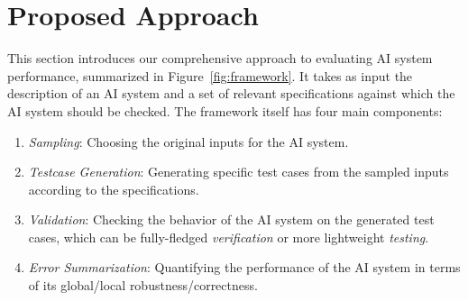 
\section{Proposed Approach}

This section introduces our comprehensive approach to evaluating AI system performance, summarized in Figure~\ref{fig:framework}. It takes as input the description of an AI system and a set of relevant specifications against which the AI system should be checked. The framework itself has four main components:

\begin{enumerate}[\it (i)]
    \item \emph{Sampling}: Choosing the original inputs for the AI system.
    \item \emph{Testcase Generation}: Generating specific test cases from the sampled inputs according to the specifications.
    \item \emph{Validation}: Checking the behavior of the AI system on the generated test cases, which can be fully-fledged \emph{verification} or more lightweight \emph{testing}.
    \item \emph{Error Summarization}: Quantifying the performance of the AI system in terms of its global/local robustness/correctness.
\end{enumerate}

